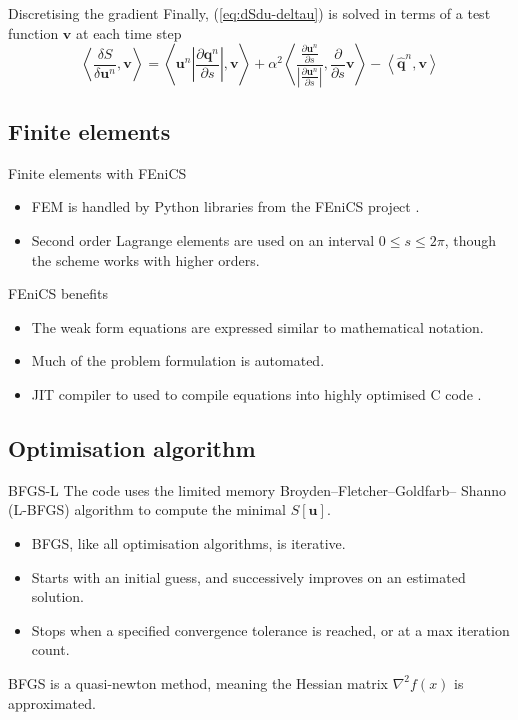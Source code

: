 \documentclass{beamer}
\newcommand{\eq}[1]{(\ref{eq:#1})}
\newcommand{\vect}[1]{\ensuremath{\mathbf{#1}}}
\newcommand{\hvect}[1]{\ensuremath{\hat{\vect{#1}}}}
\newcommand{\pp}[2]{\frac{\partial #1}{\partial #2}}
\newcommand{\vv}[2]{\frac{\delta #1}{\delta #2}}
\newcommand{\angles}[1]{\left\langle #1 \right\rangle}
\begin{document}
\begin{frame}{Discretising the gradient}
Finally, \eq{dSdu-deltau} is solved in terms of a test function $\vect v$ at
each time step
\begin{equation}
  \label{eq:dSdu}
  \angles{\vv{S}{\vect u^n}, \vect v} = \angles{\vect u^n \left|\pp{\vect q^n}{s}\right|, \vect v} 
  + \alpha^2 \angles{\frac{\pp{\vect u^n}{s}}{\left|\pp{\vect u^n}{s}\right|},\pp{}{s}\vect v}
    - \angles{\hvect q^n,\vect v}
\end{equation}
\end{frame}

\subsection{Finite elements}
\begin{frame}{Finite elements with FEniCS}

\begin{itemize}
\item FEM is  handled by Python libraries from the FEniCS project \cite{logg2007fenics}.
\item Second order Lagrange elements are used on an interval $0 \leq s \leq 2\pi$, though the scheme works with higher orders.
\end{itemize}

\begin{block}{FEniCS benefits}
  \begin{itemize}
    \item The weak form equations are expressed similar to mathematical notation.
    \item Much of the problem formulation is automated.
    \item  JIT compiler to used to compile equations into highly optimised C code  \cite{logg2007automated}.
    \end{itemize}
\end{block}

\end{frame}

\subsection{Optimisation algorithm}
\begin{frame}{BFGS-L}
The code uses the limited memory Broyden--Fletcher--Goldfarb-- Shanno (L-BFGS) \cite{byrd1995limited} algorithm to compute the minimal $S[\vect u]$.

\begin{itemize}
\item BFGS, like all optimisation algorithms, is iterative. 
\item Starts with an initial guess, and successively improves on an estimated solution.
\item Stops when a specified convergence tolerance is
reached, or at a max iteration count.
\end{itemize}

BFGS is a quasi-newton method, meaning the Hessian matrix $\nabla^2 f(x)$ is approximated.

\end{frame}
\end{document}
